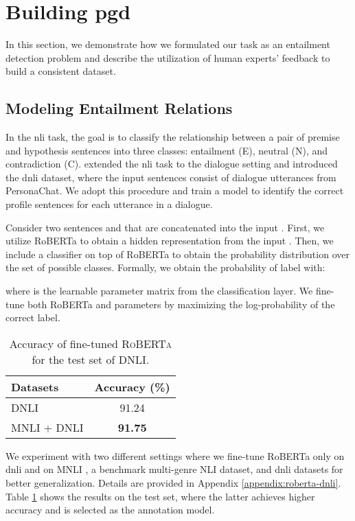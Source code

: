 \documentclass[11pt]{article}
\begin{document}
\section{Building \gls*{pgd}}

In this section, we demonstrate how we formulated our task as an entailment detection problem and describe the utilization of human experts' feedback to build a consistent dataset.

\subsection{Modeling Entailment Relations}\label{sec:model}

In the \gls*{nli} task, the goal is to classify the relationship between a pair of premise and hypothesis sentences into three classes: entailment (E), neutral (N), and contradiction (C). \citet{DNLI} extended the \gls*{nli} task to the dialogue setting and introduced the \gls*{dnli} dataset, where the input sentences consist of dialogue utterances from PersonaChat.
We adopt this procedure and train a model  to identify the correct profile sentences for each utterance in a dialogue.

Consider two sentences  and  that are concatenated into the input .
First, we utilize RoBERTa \cite{ROBERTA} to obtain a hidden representation  from the input .
Then, we include a  classifier on top of RoBERTa to obtain the probability distribution over the set of possible classes.
Formally, we obtain the probability of label  with:



where  is the learnable parameter matrix from the classification layer. 
We fine-tune both RoBERTa and  parameters by maximizing the log-probability of the correct label.

\begin{table}[ht]
    \centering
    \begin{tabular}{lc}
    \hline
    \textbf{Datasets} & \textbf{Accuracy (\%)}\\
    \hline
    DNLI & 91.24 \\
    MNLI + DNLI & \textbf{91.75} \\
    \hline
    \end{tabular}
\caption{Accuracy of fine-tuned \textsc{RoBERTa} for the test set of DNLI.}
\label{tab:acc-dnli}
\end{table}

We experiment with two different settings where we fine-tune RoBERTa only on \gls*{dnli} and on MNLI \cite{MNLI}, a benchmark multi-genre NLI dataset, and \gls*{dnli} datasets for better generalization.
Details are provided in Appendix \ref{appendix:roberta-dnli}.
Table \ref{tab:acc-dnli} shows the results on the test set, where the latter achieves higher accuracy and is selected as the annotation model.
\end{document}
